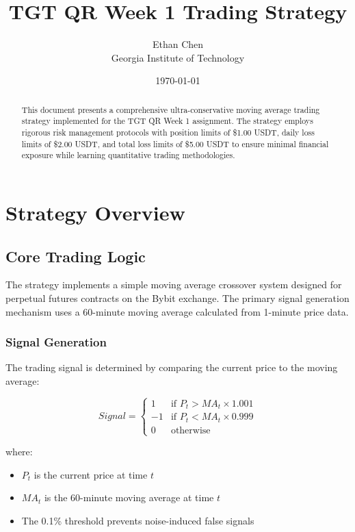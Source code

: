 \documentclass[12pt,a4paper]{article}
\title{TGT QR Week 1 Trading Strategy}
\author{Ethan Chen \\ Georgia Institute of Technology}
\date{\today}
\begin{document}
\maketitle

\begin{abstract}
This document presents a comprehensive ultra-conservative moving average trading strategy implemented for the TGT QR Week 1 assignment. The strategy employs rigorous risk management protocols with position limits of \$1.00 USDT, daily loss limits of \$2.00 USDT, and total loss limits of \$5.00 USDT to ensure minimal financial exposure while learning quantitative trading methodologies.
\end{abstract}

\section{Strategy Overview}

\subsection{Core Trading Logic}
The strategy implements a simple moving average crossover system designed for perpetual futures contracts on the Bybit exchange. The primary signal generation mechanism uses a 60-minute moving average calculated from 1-minute price data.

\subsubsection{Signal Generation}
The trading signal is determined by comparing the current price to the moving average:

\begin{equation}
Signal = \begin{cases}
1 & \text{if } P_t > MA_t \times 1.001 \\
-1 & \text{if } P_t < MA_t \times 0.999 \\
0 & \text{otherwise}
\end{cases}
\end{equation}

where:
\begin{itemize}
\item $P_t$ is the current price at time $t$
\item $MA_t$ is the 60-minute moving average at time $t$
\item The 0.1\% threshold prevents noise-induced false signals
\end{itemize}
\end{document}
